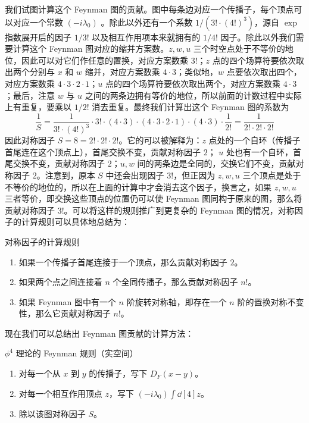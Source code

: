 我们试图计算这个 Feynman 图的贡献。图中每条边对应一个传播子，每个顶点可以对应一个常数 $(-i\lambda_0)$ 。除此以外还有一个系数 $1/(3!\cdot (4!)^3)$，源自 $\exp$ 指数展开后的因子 $1/3!$ 以及相互作用项本来就拥有的 $1/4!$ 因子。除此以外我们需要计算这个 Feynman 图对应的缩并方案数。$z,w,u$ 三个时空点处于不等价的地位，因此可以对它们作任意的置换，对应方案数乘 $3!$；$z$ 点的四个场算符要依次取出两个分别与 $x$ 和 $w$ 缩并，对应方案数乘 $4\cdot 3$；类似地，$w$ 点要依次取出四个，对应方案数乘 $4\cdot 3\cdot 2\cdot 1$；$u$ 点的四个场算符要依次取出两个，对应方案数乘 $4\cdot 3$；最后，注意 $w$ 与 $u$ 之间的两条边拥有等价的地位，所以前面的计数过程中实际上有重复，要乘以 $1/2!$ 消去重复。最终我们计算出这个 Feynman 图的系数为
\begin{equation}
\frac{1}{S}=\frac{1}{3!\cdot (4!)^3}\cdot 3! \cdot (4\cdot 3)\cdot (4\cdot 3\cdot 2\cdot 1)\cdot (4\cdot 3)\cdot \frac{1}{2!}=\frac{1}{2!\cdot 2!\cdot 2!}
\end{equation}
因此对称因子 $S=8=2!\cdot 2!\cdot 2!$。它的可以被解释为：$z$ 点处的一个自环（传播子首尾连在这个顶点上），首尾交换不变，贡献对称因子 $2$； $u$ 处也有一个自环，首尾交换不变，贡献对称因子 $2$；$u,w$ 间的两条边是全同的，交换它们不变，贡献对称因子 $2$。注意到，原本 $S$ 中还会出现因子 $3!$，但正因为 $z,w,u$ 三个顶点是处于不等价的地位的，所以在上面的计算中才会消去这个因子，换言之，如果 $z,w,u$ 三者等价，即交换这些顶点的位置仍可以使 Feynman 图同构于原来的图，那么将贡献对称因子 $3!$。可以将这样的规则推广到更复杂的 Feynman 图的情况，对称因子的计算规则可以具体地总结为：
\begin{theorem}{对称因子的计算规则}\label{the_wick_1}
\begin{enumerate}
\item 如果一个传播子首尾连接于一个顶点，那么贡献对称因子 $2$。
\item 如果两个点之间连接着 $n$ 个全同传播子，那么贡献对称因子 $n!$。
\item 如果 Feynman 图中有一个 $n$ 阶旋转对称轴，即存在一个 $n$ 阶的置换对称不变性，那么它贡献对称因子 $n!$。
\end{enumerate}
\end{theorem}
现在我们可以总结出 Feynman 图贡献的计算方法：
\begin{theorem}{$\phi^4$ 理论的 Feynman 规则（实空间）}
\begin{enumerate}
\item 对每一个从 $x$ 到 $y$ 的传播子，写下 $D_F(x-y)$。
\item 对每一个相互作用顶点 $z$，写下 $(-i\lambda_0)\int \dd[4]z$。
\item 除以该图对称因子 $S$。
\end{enumerate}
\end{theorem}
